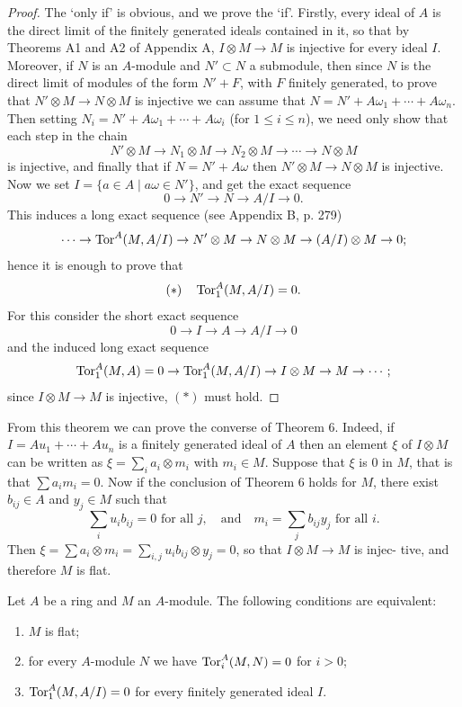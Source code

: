 \begin{proof}
The `only if' is obvious, and we prove the `if'. Firstly, every ideal
of $A$ is the direct limit of the finitely generated ideals contained in it, so
that by Theorems A1 and A2 of Appendix A, $I \otimes M \to M$ is injective for
every ideal $I$. Moreover, if $N$ is an $A$-module and $N' \subset N$ a submodule,
then since $N$ is the direct limit of modules of the form $N' + F$, with $F$
finitely generated, to prove that $N' \otimes M \to N \otimes M$ is injective we can
assume that $N = N' + A\omega_1 + \cdots + A\omega_n$. Then setting $N_i = N' + A\omega_1
+ \cdots + A\omega_i$ (for $1 \le i \le n$), we need only show that each step in the
chain
\[
  N' \otimes M \to N_1 \otimes M \to N_2 \otimes M \to \cdots \to N \otimes M
\]
is injective, and finally that if $N = N' + A\omega$ then $N' \otimes M \to N \otimes M$
is injective. Now we set $I = \{a \in A \mid a\omega \in N'\}$, and get the exact sequence
\[
  0 \to N' \to N \to A/I \to 0.
\]
This induces a long exact sequence (see Appendix B, p. 279)
\[
  \cdots \to \operatorname{Tor}^A(M, A/I) \to N' \otimes M \to N \otimes M \to (A/I) \otimes M \to 0;
\]
hence it is enough to prove that
\[
  (*) \quad \operatorname{Tor}^A_1(M, A/I) = 0.
\]
For this consider the short exact sequence
\[
  0 \to I \to A \to A/I \to 0
\]
and the induced long exact sequence
\[
  \operatorname{Tor}^A_1(M, A) = 0 \to \operatorname{Tor}^A_1(M, A/I) \to I \otimes M \to M \to \cdots;
\]
since $I \otimes M \to M$ is injective, $(*)$ must hold.
\end{proof}

From this theorem we can prove the converse of Theorem 6. Indeed, if
$I = Au_1 + \cdots + Au_n$ is a finitely generated ideal of $A$ then an element $\xi$ of
$I \otimes M$ can be written as $\xi = \sum_i a_i \otimes m_i$ with $m_i \in M$. Suppose that $\xi$ is $0$ in $M$,
that is that $\sum a_im_i = 0$. Now if the conclusion of Theorem 6 holds for $M$,
there exist $b_{ij} \in A$ and $y_j \in M$ such that
\[
  \sum_i u_ib_{ij} = 0 \text{ for all } j, \quad \text{and} \quad m_i = \sum_j b_{ij}y_j \text{ for all } i.
\]
Then $\xi = \sum a_i \otimes m_i = \sum_{i,j} u_ib_{ij} \otimes y_j = 0$, so that $I \otimes M \to M$ is injec-
tive, and therefore $M$ is flat.

\begin{theorem}\label{thm:7.8}
Let $A$ be a ring and $M$ an $A$-module. The following
conditions are equivalent:
\begin{enumerate}[(1)]
  \item $M$ is flat;
  \item for every $A$-module $N$ we have $\operatorname{Tor}^A_i(M, N) = 0$ for $i > 0$;
  \item $\operatorname{Tor}^A_1(M, A/I) = 0$ for every finitely generated ideal $I$.
\end{enumerate}
\end{theorem}

